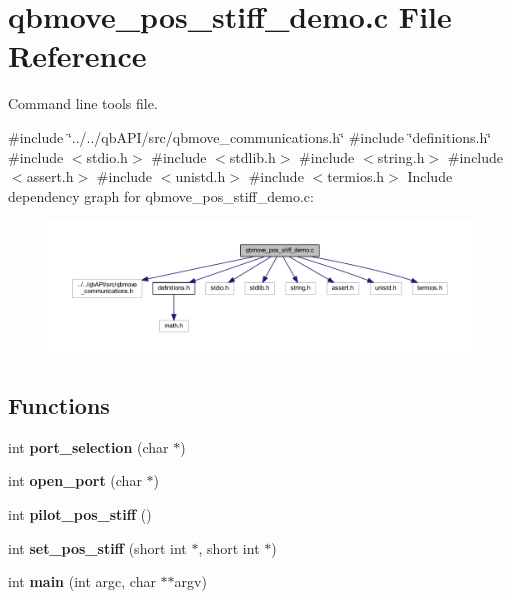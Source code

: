 \section{qbmove\+\_\+pos\+\_\+stiff\+\_\+demo.\+c File Reference}
\label{qbmove__pos__stiff__demo_8c}


Command line tools file.  


{\ttfamily \#include \char`\"{}../../qb\+A\+P\+I/src/qbmove\+\_\+communications.\+h\char`\"{}}\newline
{\ttfamily \#include \char`\"{}definitions.\+h\char`\"{}}\newline
{\ttfamily \#include $<$stdio.\+h$>$}\newline
{\ttfamily \#include $<$stdlib.\+h$>$}\newline
{\ttfamily \#include $<$string.\+h$>$}\newline
{\ttfamily \#include $<$assert.\+h$>$}\newline
{\ttfamily \#include $<$unistd.\+h$>$}\newline
{\ttfamily \#include $<$termios.\+h$>$}\newline
Include dependency graph for qbmove\+\_\+pos\+\_\+stiff\+\_\+demo.\+c\+:\nopagebreak
\begin{figure}[H]
\begin{center}
\leavevmode
\includegraphics[width=350pt]{qbmove__pos__stiff__demo_8c__incl}
\end{center}
\end{figure}
\subsection*{Functions}
\begin{DoxyCompactItemize}
\item 
\mbox{\label{qbmove__pos__stiff__demo_8c_a4347eeebb915c2bd627acfbe8cda5bb9}} 
int {\bfseries port\+\_\+selection} (char $\ast$)
\item 
\mbox{\label{qbmove__pos__stiff__demo_8c_a61a603d6ab622032ccf84775af74e960}} 
int {\bfseries open\+\_\+port} (char $\ast$)
\item 
\mbox{\label{qbmove__pos__stiff__demo_8c_a04b53d850ce92eab6144de3aec004a74}} 
int {\bfseries pilot\+\_\+pos\+\_\+stiff} ()
\item 
\mbox{\label{qbmove__pos__stiff__demo_8c_a92250d16d1b963a26d5bafbcebfd53b6}} 
int {\bfseries set\+\_\+pos\+\_\+stiff} (short int $\ast$, short int $\ast$)
\item 
\mbox{\label{qbmove__pos__stiff__demo_8c_a3c04138a5bfe5d72780bb7e82a18e627}} 
int {\bfseries main} (int argc, char $\ast$$\ast$argv)
\end{DoxyCompactItemize}
